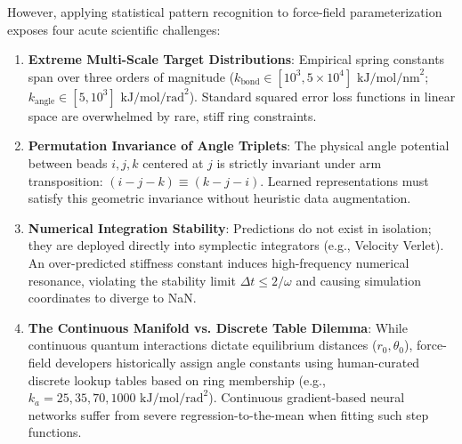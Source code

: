 \documentclass[11pt,a4paper]{article}
\begin{document}
However, applying statistical pattern recognition to force-field parameterization exposes four acute scientific challenges:
\begin{enumerate}
    \item \textbf{Extreme Multi-Scale Target Distributions}: Empirical spring constants span over three orders of magnitude ($k_{\text{bond}} \in [10^3, 5\times 10^4]\text{ kJ/mol/nm}^2$; $k_{\text{angle}} \in [5, 10^3]\text{ kJ/mol/rad}^2$). Standard squared error loss functions in linear space are overwhelmed by rare, stiff ring constraints.
    \item \textbf{Permutation Invariance of Angle Triplets}: The physical angle potential between beads $i, j, k$ centered at $j$ is strictly invariant under arm transposition: $(i-j-k) \equiv (k-j-i)$. Learned representations must satisfy this geometric invariance without heuristic data augmentation.
    \item \textbf{Numerical Integration Stability}: Predictions do not exist in isolation; they are deployed directly into symplectic integrators (e.g., Velocity Verlet). An over-predicted stiffness constant induces high-frequency numerical resonance, violating the stability limit $\Delta t \le 2/\omega$ and causing simulation coordinates to diverge to NaN.
    \item \textbf{The Continuous Manifold vs. Discrete Table Dilemma}: While continuous quantum interactions dictate equilibrium distances ($r_0, \theta_0$), force-field developers historically assign angle constants using human-curated discrete lookup tables based on ring membership (e.g., $k_a = 25, 35, 70, 1000\text{ kJ/mol/rad}^2$). Continuous gradient-based neural networks suffer from severe regression-to-the-mean when fitting such step functions.
\end{enumerate}
\end{document}

